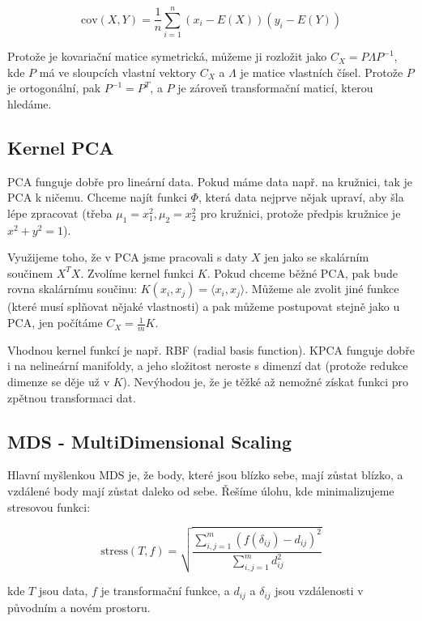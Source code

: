 \documentclass[10pt,a4paper]{article}
\begin{document}
\begin{equation}
\text{cov}(X,Y) = \frac{1}{n} \sum_{i=1}^n (x_i-E(X))(y_i-E(Y))
\end{equation}

Protože je kovariační matice symetrická, můžeme ji rozložit jako $C_X = P\Lambda P^{-1}$, kde $P$ má ve sloupcích vlastní vektory $C_X$ a $\Lambda$ je matice vlastních čísel. Protože $P$ je ortogonální, pak $P^{-1}=P^T$, a $P$ je zároveň transformační maticí, kterou hledáme.

\subsection{Kernel PCA}

PCA funguje dobře pro lineární data. Pokud máme data např. na kružnici, tak je PCA k ničemu. Chceme najít funkci $\Phi$, která data nejprve nějak upraví, aby šla lépe zpracovat (třeba $\mu_1 = x_1^2, \mu_2 = x_2^2$ pro kružnici, protože předpis kružnice je $x^2+y^2=1$).

Využijeme toho, že v PCA jsme pracovali s daty $X$ jen jako se skalárním součinem $X^TX$. Zvolíme kernel funkci $K$. Pokud chceme běžné PCA, pak bude rovna skalárnímu součinu: $K(x_i, x_j) = \langle x_i, x_j\rangle$. Můžeme ale zvolit jiné funkce (které musí splňovat nějaké vlastnosti) a pak můžeme postupovat stejně jako u PCA, jen počítáme $C_X = \frac{1}{m}K$.

Vhodnou kernel funkcí je např. RBF (radial basis function). KPCA funguje dobře i na nelineární manifoldy, a jeho složitost neroste s dimenzí dat (protože redukce dimenze se děje už v $K$). Nevýhodou je, že je těžké až nemožné získat funkci pro zpětnou transformaci dat.

\subsection{MDS - MultiDimensional Scaling}

Hlavní myšlenkou MDS je, že body, které jsou blízko sebe, mají zůstat blízko, a vzdálené body mají zůstat daleko od sebe. Řešíme úlohu, kde minimalizujeme stresovou funkci:

\begin{equation}
\text{stress}(T, f)=\sqrt{\frac{\sum_{i,j=1}^m(f(\delta_{ij})-d_{ij})^2}{\sum_{i,j=1}^m d_{ij}^2}}
\end{equation}

\noindent kde $T$ jsou data, $f$ je transformační funkce, a $d_{ij}$ a $\delta_{ij}$ jsou vzdálenosti v původním a novém prostoru.
\end{document}
